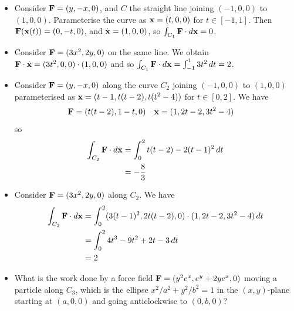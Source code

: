 \documentclass{../template/note}
\begin{document}
    \begin{example*}
        \begin{itemize}
            \item Consider \(\V F = (y, -x, 0)\), and \(C\) the straight line joining \((-1, 0, 0)\) to \((1, 0, 0)\). Parameterise the curve as \(\V x = (t, 0, 0)\) for \(t \in [-1, 1]\). Then \(\V F(\V x(t)) = (0, -t, 0)\), and \(\dot{\V x} = (1, 0, 0)\), so \(\int_{C_1} \V F \cdot d \V x = 0\).
            \item Consider \(\V F = (3x^2, 2y, 0)\) on the same line. We obtain \(\V F \cdot \dot{\V x} = (3t^2, 0, 0) \cdot (1, 0, 0)\) and so \(\int_{C_1} \V F \cdot d \V x = \int_{-1}^1 3t^2 \D t = 2\).
            \item Consider \(\V F = (y, -x, 0)\) along the curve \(C_2\) joining \((-1, 0, 0)\) to \((1, 0, 0)\) parameterised as \(\V x = (t-1, t(t-2), t(t^2-4))\) for \(t \in [0, 2]\). We have
            \begin{align*}
                \V F &= (t(t-2), 1-t, 0) && \V x = (1, 2t-2, 3t^2-4)
            \end{align*}
            so
            \begin{align*}
                \int_{C_2} \V F \cdot d \V x &= \int_0^2 t(t-2) - 2(t-1)^2 \D t \\
                &= -\frac 8 3
            \end{align*}
            \item Consider \(\V F = (3x^2, 2y, 0)\) along \(C_2\). We have
            \begin{align*}
                \int_{C_2} \V F \cdot d \V x &= \int_0^2 (3(t-1)^2, 2t(t-2), 0) \cdot (1, 2t-2, 3t^2-4) \D t \\
                &= \int_0^2 4t^3 - 9t^2 + 2t - 3 \D t \\
                &= 2
            \end{align*}
            \item What is the work done by a force field \(\V F = (y^2e^x, e^y + 2ye^x, 0)\) moving a particle along \(C_3\), which is the ellipse \(x^2/a^2 + y^2/b^2 = 1\) in the \((x, y)\)-plane starting at \((a, 0, 0)\) and going anticlockwise to \((0, b, 0)\)?    
            

\end{itemize}
\end{example*}
\end{document}
